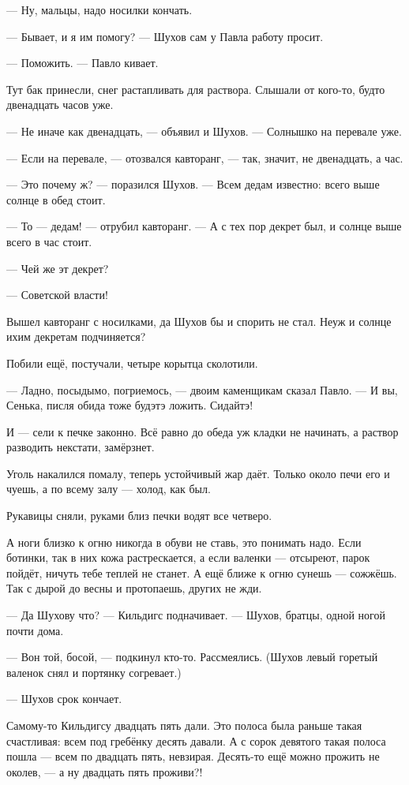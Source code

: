 --- Ну, мальцы, надо носилки кончать.

--- Бывает, и я им помогу? --- Шухов сам у Павла работу просит.

--- Поможить. --- Павло кивает.

Тут бак принесли, снег растапливать для раствора. Слышали от кого-то, будто двенадцать часов
уже.

--- Не иначе как двенадцать, --- объявил и Шухов. --- Солнышко на перевале уже.

--- Если на перевале, --- отозвался кавторанг, --- так, значит, не двенадцать, а час.

--- Это почему ж? --- поразился Шухов. --- Всем дедам известно: всего выше солнце в обед стоит.

--- То --- дедам! --- отрубил кавторанг. --- А с тех пор декрет был, и солнце выше всего в час стоит.

--- Чей же эт декрет?

--- Советской власти!

Вышел кавторанг с носилками, да Шухов бы и спорить не стал. Неуж и солнце ихим декретам
подчиняется?

Побили ещё, постучали, четыре корытца сколотили.

--- Ладно, посыдымо, погриемось, --- двоим каменщикам сказал Павло. --- И вы, Сенька, писля обида
тоже будэтэ ложить. Сидайтэ!

И --- сели к печке законно. Всё равно до обеда уж кладки не начинать, а раствор разводить
некстати, замёрзнет.

Уголь накалился помалу, теперь устойчивый жар даёт. Только около печи его и чуешь, а по всему
залу --- холод, как был.

Рукавицы сняли, руками близ печки водят все четверо.

А ноги близко к огню никогда в обуви не ставь, это понимать надо. Если ботинки, так в них кожа
растрескается, а если валенки --- отсыреют, парок пойдёт, ничуть тебе теплей не станет. А ещё
ближе к огню сунешь --- сожжёшь. Так с дырой до весны и протопаешь, других не жди.

--- Да Шухову что? --- Кильдигс подначивает. --- Шухов, братцы, одной ногой почти дома.

--- Вон той, босой, --- подкинул кто-то. Рассмеялись. (Шухов левый горетый валенок снял и
портянку согревает.)

--- Шухов срок кончает.

Самому-то Кильдигсу двадцать пять дали. Это полоса была раньше такая счастливая: всем под
гребёнку десять давали. А с сорок девятого такая полоса пошла --- всем по двадцать пять,
невзирая. Десять-то ещё можно прожить не околев, --- а ну двадцать пять проживи?!

